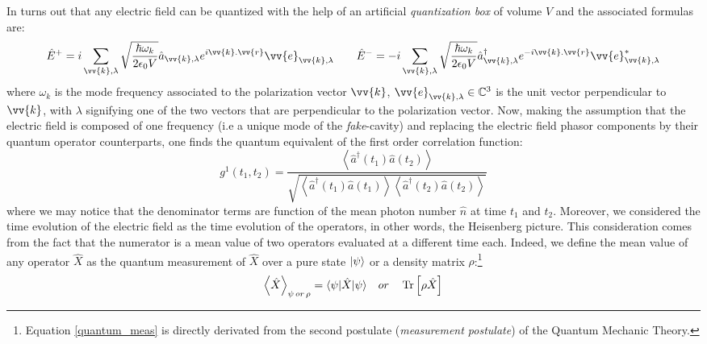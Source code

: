 \documentclass[11pt]{report}
\DeclarePairedDelimiter\bra{\langle}{\rvert}
\DeclarePairedDelimiter\ket{\lvert}{\rangle}
\DeclareMathOperator{\Tr}{Tr}
\begin{document}
In turns out that any electric field can be quantized  with the help of an artificial \textit{quantization box} of volume $V$ and the associated formulas are:
\begin{equation}
{\displaystyle {\hat {E}}^{+}=i\sum \limits _{\vv {k} ,\lambda }{\sqrt {\frac {\hbar \omega _{k}}{2\epsilon _{0}V}}}{\hat {a}}_{\vv {k} ,\lambda }e^{i\vv {k} .\vv {r} }\vv {e} _{\vv {k} ,\lambda }} \quad \quad {\displaystyle {\hat {E}}^{-}=-i\sum \limits _{\vv {k} ,\lambda }{\sqrt {\frac {\hbar \omega _{k}}{2\epsilon _{0}V}}}{\hat {a}}^\dagger_{\vv {k} ,\lambda }e^{-i\vv {k} .\vv {r} }\vv {e}^* _{\vv {k} ,\lambda }}
\end{equation}
where ${\displaystyle \omega _{k}}$ is the mode frequency associated to the polarization vector ${\displaystyle \vv {k} }$, 
${\displaystyle \vv {e} _{\vv {k} ,\lambda }} \in \mathbb{C}^3$ is the unit vector perpendicular to 
${\displaystyle \vv {k} }$, with 
${\displaystyle \lambda }$ signifying one of the two vectors that are perpendicular to the polarization vector. Now, making the assumption that the electric field is composed of one frequency (i.e a unique mode of the \textit{fake}-cavity) and replacing the electric field phasor components by their quantum operator counterparts, one finds the quantum equivalent of the first order correlation function:
\begin{equation}
g^1(t_1, t_2) = \frac{\left\langle \hat{a}^\dagger(t_1)\hat{a}(t_2) \right\rangle}{\sqrt{\left\langle \hat{a}^\dagger(t_1)\hat{a}(t_1) \right\rangle \left\langle \hat{a}^\dagger(t_2)\hat{a}(t_2) \right\rangle}}
\end{equation}
where we may notice that the denominator terms are function of the mean photon number $\hat{n}$ at time $t_1$ and $t_2$. Moreover, we considered the time evolution of the electric field as the time evolution of the operators, in other words, the Heisenberg picture. This consideration comes from the fact that the numerator is a mean value of two operators evaluated at a different time each. Indeed, we define the mean value of any operator $\hat{X}$ as the quantum measurement of $\hat{X}$ over a pure state $\ket{\psi}$ or a density matrix $\rho$:\footnote{Equation \eqref{quantum_meas} is directly derivated from the second postulate (\textit{measurement postulate}) of the Quantum Mechanic Theory.}
\begin{equation}
\label{quantum_meas}
\left\langle \hat{X} \right\rangle_{\psi \, or \, \rho} = \bra{\psi}\hat{X}\ket{\psi} \quad or \quad \Tr \left[ \rho \hat{X} \right]
\end{equation}
\end{document}
